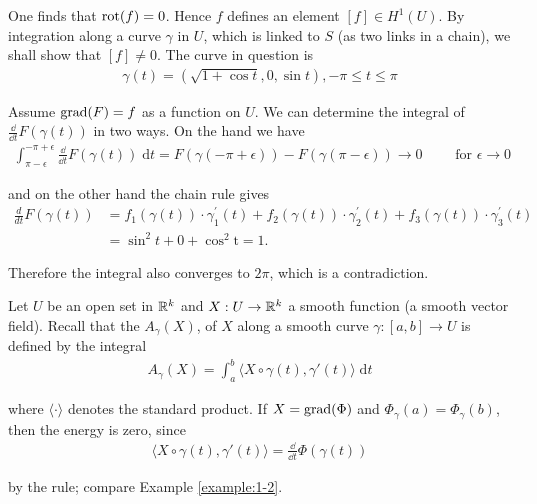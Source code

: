 One finds that $\operatorname{rot}(f) = 0$. Hence $f$ defines an element $[f] \in H^1(U)$. By
integration along a curve $\gamma$ in $U$, which is linked to $S$ (as two links in a chain),
we shall show that $[f] \neq 0$. The curve in question is
\begin{align*}
  \gamma(t) = \left(\sqrt{1+\cos t}, 0, \sin t\right), -\pi\le t\le \pi
\end{align*}

Assume $\operatorname{grad}(F) = f$ as a function on $U$. We can determine the integral of 
$\frac{\dd }{\dd t}F(\gamma(t))$ in two ways. On the hand we have
\begin{align*}
  \int_{\pi-\epsilon}^{-\pi+\epsilon}{\frac{\dd }{\dd t}F(\gamma(t)) \;\mathrm{d}t}
  = F(\gamma(-\pi+\epsilon)) - F(\gamma(\pi-\epsilon))
  \to 0\qquad \text{ for } \epsilon\to 0
\end{align*}

and on the other hand the chain rule gives
\begin{align*}
  \frac{d}{dt}F(\gamma(t))
  & = f_{1}(\gamma(t)) \cdot\gamma_{1}^{\prime}(t)+f_{2}(\gamma(t))\cdot\gamma_{2}^{\prime}(t)+f_{3}(\gamma(t))\cdot \gamma_{3}^{\prime}(t) \\
  & = \sin^{2}t+0+\cos^{2}\mathrm{t}=1.
\end{align*}

Therefore the integral also converges to $2\pi$, which is a contradiction.

\begin{example}
  Let $U$ be an open set in $\mathbb{R}^k$ and $X: U\to \mathbb{R}^k$ a smooth function (a smooth vector field). 
Recall that the  $A_\gamma(X)$, of $X$ along a smooth curve $\gamma: [a, b]\to U$ is 
defined by the integral
\begin{align*}
  A_\gamma(X) = \int_{a}^{b}{\langle X\circ \gamma(t), \gamma'(t)\rangle\;\mathrm{d}t}
\end{align*}

where $\langle\cdot\rangle$ denotes the standard product. If $X = \operatorname{grad}(\Phi)$ and $\Phi_\gamma(a) = \Phi_\gamma(b)$,
then the energy is zero, since 
\begin{align*}
  \langle X\circ \gamma(t), \gamma'(t)\rangle = \frac{\dd }{\dd t}\Phi(\gamma(t))
\end{align*}

by the rule; compare Example \ref{example:1-2}.
\end{example}